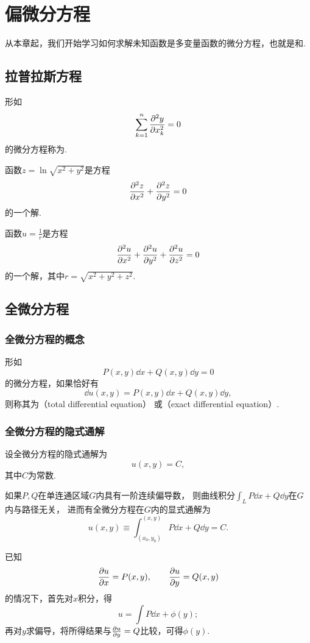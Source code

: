 \chapter{偏微分方程}
从本章起，我们开始学习如何求解未知函数是多变量函数的微分方程，也就是和.

\section{拉普拉斯方程}
\begin{definition}
形如\[
\sum\limits_{k=1}^n \pdv[2]{y}{x_k} = 0
\]的微分方程称为.
\end{definition}

\begin{example}
函数\(z=\ln\sqrt{x^2+y^2}\)是方程\[
\pdv[2]{z}{x} + \pdv[2]{z}{y} = 0
\]的一个解.
\end{example}

\begin{example}
函数\(u=\frac{1}{r}\)是方程\[
\pdv[2]{u}{x} + \pdv[2]{u}{y} + \pdv[2]{u}{z} = 0
\]的一个解，其中\(r=\sqrt{x^2+y^2+z^2}\).
\end{example}

\section{全微分方程}
\subsection{全微分方程的概念}
\begin{definition}
形如\[
P(x,y)\dd{x} + Q(x,y)\dd{y} = 0
\]的微分方程，如果恰好有\[
\dd{u(x,y)} = P(x,y)\dd{x} + Q(x,y)\dd{y},
\]则称其为（total differential equation）%
或（exact differential equation）.
\end{definition}

\subsection{全微分方程的隐式通解}
设全微分方程的隐式通解为\[
u(x,y) = C,
\]其中\(C\)为常数.

如果\(P,Q\)在单连通区域\(G\)内具有一阶连续偏导数，
则曲线积分\(\int_L P\dd{x}+Q\dd{y}\)在\(G\)内与路径无关，
进而有全微分方程在\(G\)内的显式通解为\[
u(x,y) \equiv \int_{(x_0,y_0)}^{(x,y)} P\dd{x}+Q\dd{y} = C.
\]

已知\[
\pdv{u}{x} = P(x,y),
\qquad
\pdv{u}{y} = Q(x,y)
\]的情况下，首先对\(x\)积分，得\[
u = \int P \dd{x} + \phi(y);
\]再对\(y\)求偏导，将所得结果与\(\pdv{u}{y} = Q\)比较，可得\(\phi(y)\).

